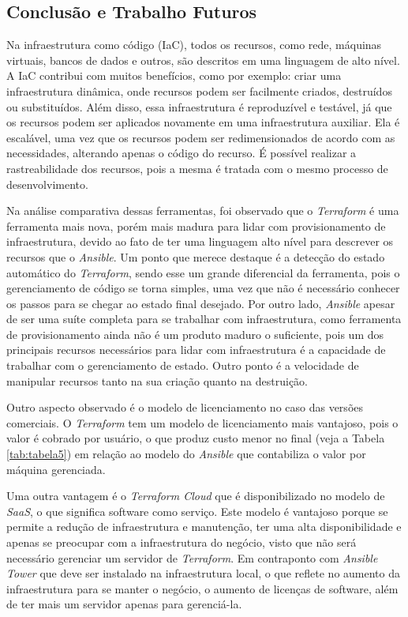\hfill




\subsection{Conclusão e Trabalho Futuros}
Na infraestrutura como código (IaC), todos os recursos, como rede, máquinas virtuais, bancos de dados e outros, são descritos em uma linguagem de alto nível. A IaC contribui com muitos benefícios, como por exemplo: criar uma infraestrutura dinâmica, onde recursos podem ser facilmente criados, destruídos ou substituídos. Além disso, essa infraestrutura é reproduzível e testável, já que os recursos podem ser aplicados novamente em uma infraestrutura auxiliar. Ela é escalável, uma vez que os recursos podem ser redimensionados de acordo com as necessidades, alterando apenas o código do recurso. É possível realizar a rastreabilidade dos recursos, pois a mesma é tratada com o mesmo processo de desenvolvimento. 

Na análise comparativa dessas ferramentas, foi observado que o \textit{Terraform} é uma ferramenta mais nova, porém mais madura para lidar com provisionamento de infraestrutura, devido ao fato de ter uma linguagem alto nível para descrever os recursos que o \textit{Ansible}. Um ponto que merece destaque é a detecção do estado automático do \textit{Terraform}, sendo esse um grande diferencial da ferramenta, pois o gerenciamento de código se torna simples, uma vez que não é necessário conhecer os passos para se chegar ao estado final desejado. Por outro lado,  \textit{Ansible} apesar de ser uma suíte completa para se trabalhar com infraestrutura, como ferramenta de provisionamento ainda não é um produto maduro o suficiente, pois um dos principais recursos necessários para lidar com infraestrutura é a capacidade de trabalhar com o gerenciamento de estado. Outro ponto é a velocidade de manipular recursos tanto na sua criação quanto na destruição. 

Outro aspecto observado é o modelo de licenciamento no caso das versões comerciais. O \textit{Terraform} tem um modelo de licenciamento mais vantajoso, pois o valor é cobrado por usuário, o que produz custo menor no final (veja a Tabela \ref{tab:tabela5}) em relação ao modelo do \textit{Ansible} que contabiliza o valor por máquina gerenciada. 

Uma outra vantagem é o \textit{Terraform Cloud} que é disponibilizado no modelo de \textit{SaaS}, o que significa software como serviço. Este modelo é vantajoso porque se permite a redução de infraestrutura e manutenção, ter uma alta disponibilidade e apenas se preocupar com a infraestrutura do negócio, visto que não será necessário gerenciar um servidor de \textit{Terraform}. Em contraponto com \textit{Ansible Tower} que deve ser instalado na infraestrutura local, o que reflete no aumento da infraestrutura para se manter o negócio, o aumento de licenças de software, além de ter mais um servidor apenas para gerenciá-la. 

